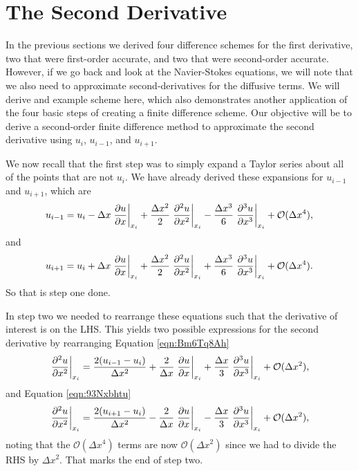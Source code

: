 \section{The Second Derivative}
In the previous sections we derived four difference schemes for the first derivative, two that were first-order accurate, and two that were second-order accurate. However, if we go back and look at the Navier-Stokes equations, we will note that we also need to approximate second-derivatives for the diffusive terms. We will derive and example scheme here, which also demonstrates another application of the four basic steps of creating a finite difference scheme. Our objective will be to derive a second-order finite difference method to approximate the second derivative using $u_i$, $u_{i-1}$, and $u_{i+1}$.

We now recall that the first step was to simply expand a Taylor series about all of the points that are not $u_i$. We have already derived these expansions for $u_{i-1}$ and $u_{i+1}$, which are
\begin{equation}
	u_{i-1} = u_i - \Delta x \left.\frac{\partial u}{\partial x}\right\rvert_{x_i}^{} + \frac{\Delta x^2}{2} \left.\frac{\partial^2 u}{\partial x^2}\right\rvert_{x_i}^{} - \frac{\Delta x^3}{6} \left.\frac{\partial^3 u}{\partial x^3}\right\rvert_{x_i}^{} + \mathcal{O}(\Delta x^4),
	\label{eqn:Bm6Tq8Ah}
\end{equation}
and
\begin{equation}
	u_{i+1} = u_i + \Delta x \left.\frac{\partial u}{\partial x}\right\rvert_{x_i}^{} + \frac{\Delta x^2}{2} \left.\frac{\partial^2 u}{\partial x^2}\right\rvert_{x_i}^{} + \frac{\Delta x^3}{6} \left.\frac{\partial^3 u}{\partial x^3}\right\rvert_{x_i}^{} + \mathcal{O}(\Delta x^4).
	\label{eqn:93Nxbhtu}
\end{equation}
So that is step one done.

In step two we needed to rearrange these equations such that the derivative of interest is on the LHS. This yields two possible expressions for the second derivative by rearranging Equation \ref{eqn:Bm6Tq8Ah}
\begin{equation}
	\left.\frac{\partial^2 u}{\partial x^2}\right\rvert_{x_i}^{} = \frac{2(u_{i-1} - u_i)}{\Delta x^2} + \frac{2}{\Delta x} \left.\frac{\partial u}{\partial x}\right\rvert_{x_i}^{} + \frac{\Delta x}{3} \left.\frac{\partial^3 u}{\partial x^3}\right\rvert_{x_i}^{} + \mathcal{O}(\Delta x^2),
\end{equation}
and Equation \ref{eqn:93Nxbhtu}
\begin{equation}
	\left.\frac{\partial^2 u}{\partial x^2}\right\rvert_{x_i}^{} = \frac{2(u_{i+1} - u_i)}{\Delta x^2} - \frac{2}{\Delta x} \left.\frac{\partial u}{\partial x}\right\rvert_{x_i}^{} - \frac{\Delta x}{3} \left.\frac{\partial^3 u}{\partial x^3}\right\rvert_{x_i}^{} + \mathcal{O}(\Delta x^2),
\end{equation}
noting that the $\mathcal{O}(\Delta x^4)$ terms are now $\mathcal{O}(\Delta x^2)$ since we had to divide the RHS by $\Delta x^2$. That marks the end of step two.


